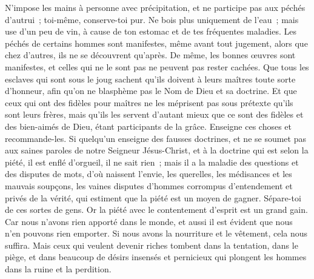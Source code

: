 \begin{multicols}{2}
N'impose les mains à personne avec précipitation, et ne participe pas aux péchés d'autrui~; toi-même, conserve-toi pur.
Ne bois plus uniquement de l'eau~; mais use d'un peu de vin, à cause de ton estomac et de tes fréquentes maladies.
Les péchés de certains hommes sont manifestes, même avant tout jugement, alors que chez d'autres, ils ne se découvrent qu'après.
De même, les bonnes œuvres sont manifestes, et celles qui ne le sont pas ne peuvent pas rester cachées.
\VerseOne{}Que tous les esclaves qui sont sous le joug sachent qu'ils doivent à leurs maîtres toute sorte d'honneur, afin qu'on ne blasphème pas le Nom de Dieu et sa doctrine.
Et que ceux qui ont des fidèles pour maîtres ne les méprisent pas sous prétexte qu'ils sont leurs frères, mais qu'ils les servent d'autant mieux que ce sont des fidèles et des bien-aimés de Dieu, étant participants de la grâce. Enseigne ces choses et recommande-les.
Si quelqu'un enseigne des fausses doctrines, et ne se soumet pas aux saines paroles de notre Seigneur Jésus-Christ, et à la doctrine qui est selon la piété,
il est enflé d'orgueil, il ne sait rien~; mais il a la maladie des questions et des disputes de mots, d'où naissent l'envie, les querelles, les médisances et les mauvais soupçons,
les vaines disputes d'hommes corrompus d'entendement et privés de la vérité, qui estiment que la piété est un moyen de gagner. Sépare-toi de ces sortes de gens.
Or la piété avec le contentement d'esprit est un grand gain.
Car nous n'avons rien apporté dans le monde, et aussi il est évident que nous n'en pouvons rien emporter.
Si nous avons la nourriture et le vêtement, cela nous suffira.
Mais ceux qui veulent devenir riches tombent dans la tentation, dans le piège, et dans beaucoup de désirs insensés et pernicieux qui plongent les hommes dans la ruine et la perdition.

\end{multicols}
